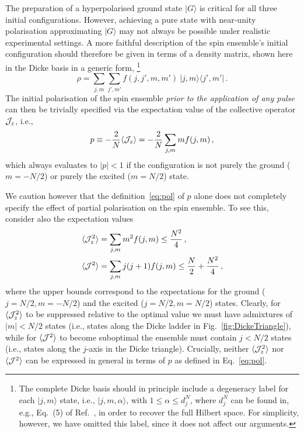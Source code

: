 \documentclass[aps,prd,10pt,twocolumn,superscriptaddress,floatfix,nofootinbib,amsmath,amssymb,altaffilletter,preprintnumbers]{revtex4-1}
\begin{document}
The preparation of a hyperpolarised ground state $|G\rangle$ is critical for all three initial configurations.   However, achieving a pure state with near-unity polarisation approximating $|G\rangle$ may not always be possible under realistic experimental settings.  A more faithful description of the spin ensemble's initial configuration should therefore be given in terms of a density matrix, shown here in the Dicke basis in a generic form,%
%
\footnote{The complete Dicke basis should in principle include a degeneracy label for each $|j,m\rangle$ state, i.e., $|j,m,\alpha\rangle$, with $1\leq \alpha \leq d_j^N$, where $d_j^N$ can be found in, e.g., Eq.~(5) of Ref.~\cite{Shammah_2017}, 
in order to recover the full Hilbert space.  For simplicity, however, we have omitted this label, since it does not affect our arguments.}
%
\begin{equation}
\rho=\sum_{j,m} \sum_{j',m'} f(j,j',m,m') ~\vert j, m\rangle\langle j', m'\vert \, .
\label{eq:dickerho}
\end{equation} 
The initial polarisation of the spin ensemble {\it prior to the application of any pulse} can then be trivially specified via the expectation value of the collective operator ${\cal J}_z$, i.e., 
\begin{equation}
p \equiv - \frac{2}{N}\langle {\cal J}_z\rangle =-\frac{2}{N}\sum_{j,m} m  f(j,m)\, ,
\label{eq:pol}
\end{equation}
which always evaluates to $|p| < 1$ if the configuration is not purely the ground ($m=-N/2$) or purely the excited ($m=N/2$) state.

We caution however that the definition~\eqref{eq:pol} of $p$ alone does not completely specify the effect of partial polarisation on the spin ensemble. To see this, consider also the expectation values
\begin{equation}
\begin{aligned}
\langle {\cal J}_z^2 \rangle & = \sum_{j,m} m^2  f(j,m) \leq \frac{N^2}{4}\, , \\
\langle {\cal J}^2 \rangle &= \sum_{j,m} j(j+1)  f(j,m) \leq \frac{N}{2} + \frac{N^2}{4}\, ,
\end{aligned}
\end{equation} 
where the upper bounds correspond to the expectations for the ground  ($j=N/2,m=-N/2$)  and the excited  ($j=N/2,m=N/2$) states.   Clearly, for $\langle {\cal J}_z^2 \rangle$ to be suppressed relative to the optimal value we must have admixtures of $|m| < N/2$ states (i.e., states along the Dicke ladder in Fig.~\ref{fig:DickeTriangle}), while for  $\langle {\cal J}^2 \rangle$ to become suboptimal the ensemble must contain $j<N/2$ states (i.e., states along the $j$-axis in the Dicke triangle).
Crucially, neither $\langle {\cal J}_z^2 \rangle$ nor $\langle {\cal J}^2 \rangle$ can be expressed in general in terms of $p$ as defined in Eq.~\eqref{eq:pol}.
\end{document}
